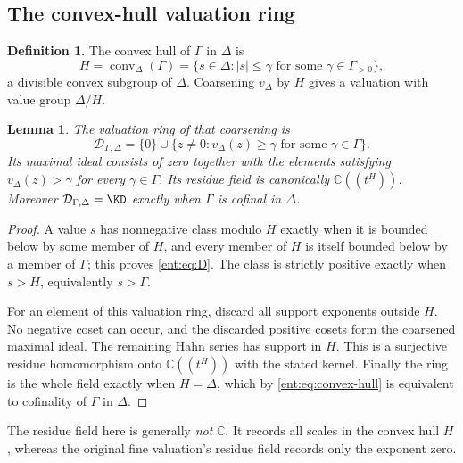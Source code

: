 \documentclass[11pt]{article}
\theoremstyle{plain}
\newtheorem{lemma}[lemma]{Lemma}
\theoremstyle{plain}
\theoremstyle{plain}
\theoremstyle{definition}
\newtheorem{definition}[definition]{Definition}
\theoremstyle{definition}
\theoremstyle{definition}
\theoremstyle{definition}
\theoremstyle{remark}
\newcommand{\C}{\mathbb C}\newcommand{\R}{\mathbb R}
\newcommand{\Dom}{\mathcal D_{\Gamma,\Delta}}
\DeclareMathOperator{\conv}{conv}
\begin{document}
\subsection{The convex-hull valuation ring}
\begin{definition}\label{ent:def:hull}
The convex hull of $\Gamma$ in $\Delta$ is
\begin{equation}\label{ent:eq:convex-hull}
 H=\conv_\Delta(\Gamma)
 =\{s\in\Delta:|s|\le\gamma\text{ for some }\gamma\in\Gamma_{>0}\},
\end{equation}
a divisible convex subgroup of $\Delta$. Coarsening $v_\Delta$ by $H$ gives a
valuation with value group $\Delta/H$.
\end{definition}

\begin{lemma}\label{ent:lem:coarsened-ring}
The valuation ring of that coarsening is
\begin{equation}\label{ent:eq:D}
 \Dom
 =\{0\}\cup\{z\ne0:v_\Delta(z)\ge\gamma
                       \text{ for some }\gamma\in\Gamma\}.
\end{equation}
Its maximal ideal consists of zero together with the elements satisfying
$v_\Delta(z)>\gamma$ for every $\gamma\in\Gamma$. Its residue field is
canonically $\C((t^H))$. Moreover $\Dom=\KD$ exactly when $\Gamma$ is cofinal
in $\Delta$.
\end{lemma}
\begin{proof}
A value $s$ has nonnegative class modulo $H$ exactly when it is bounded below
by some member of $H$, and every member of $H$ is itself bounded below by a
member of $\Gamma$; this proves \eqref{ent:eq:D}. The class is strictly
positive exactly when $s>H$, equivalently $s>\Gamma$.

For an element of this valuation ring, discard all support exponents outside
$H$. No negative coset can occur, and the discarded positive cosets form the
coarsened maximal ideal. The remaining Hahn series has support in $H$. This
is a surjective residue homomorphism onto $\C((t^H))$ with the stated kernel.
Finally the ring is the whole field exactly when $H=\Delta$, which by
\eqref{ent:eq:convex-hull} is equivalent to cofinality of $\Gamma$ in
$\Delta$.
\end{proof}

The residue field here is generally \emph{not} $\C$. It records all scales in
the convex hull $H$, whereas the original fine valuation's residue field
records only the exponent zero.
\end{document}
